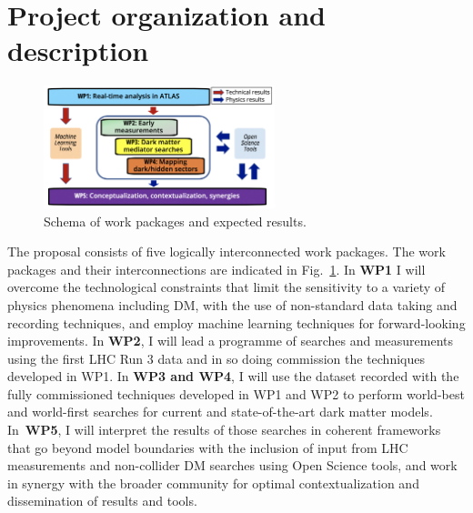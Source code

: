 \documentclass[11pt,a4paper]{article}
\begin{document}
\section{Project organization and description} 
\smallskip


\begin{figure} 
\begin{center}
\includegraphics[width=0.6\textwidth]{figs/WPs_shorter}
\caption{\label{fig:WPs} \footnotesize Schema of work packages and expected results.
}
\end{center}

\vskip10pt
\end{figure}

The proposal consists of five logically interconnected work packages.
The work packages and their interconnections are indicated in Fig.~\ref{fig:WPs}. 
In \textbf{WP1} I will overcome the technological constraints that limit the sensitivity to a variety of physics phenomena including DM, with the use of non-standard data taking and recording techniques, and employ machine learning techniques for forward-looking improvements. 
In \textbf{WP2}, I will lead a programme of searches and measurements using the first LHC Run 3 data and in so doing commission the techniques developed in WP1. 
In \textbf{WP3 and WP4}, I will use the dataset recorded with the fully commissioned techniques developed in WP1 and WP2 to perform world-best and world-first searches for current and state-of-the-art dark matter models. 
In~\textbf{WP5}, I will interpret the results of those searches in coherent frameworks that go beyond model boundaries with the inclusion of input from LHC measurements and non-collider DM searches using Open Science tools, and work in synergy with the broader community for optimal contextualization and dissemination of results and tools. %
\end{document}
